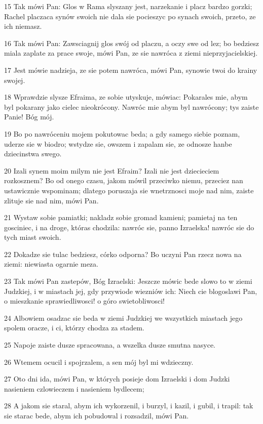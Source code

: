 \par 15 Tak mówi Pan: Glos w Rama slyszany jest, narzekanie i placz bardzo gorzki; Rachel placzaca synów swoich nie dala sie pocieszyc po synach swoich, przeto, ze ich niemasz.
\par 16 Tak mówi Pan: Zawsciagnij glos swój od placzu, a oczy swe od lez; bo bedziesz miala zaplate za prace swoje, mówi Pan, ze sie nawróca z ziemi nieprzyjacielskiej.
\par 17 Jest mówie nadzieja, ze sie potem nawróca, mówi Pan, synowie twoi do krainy swojej.
\par 18 Wprawdzie slysze Efraima, ze sobie utyskuje, mówiac: Pokarales mie, abym byl pokarany jako cielec nieokrócony. Nawróc mie abym byl nawrócony; tys zaiste Panie! Bóg mój.
\par 19 Bo po nawróceniu mojem pokutowac beda; a gdy samego siebie poznam, uderze sie w biodro; wstydze sie, owszem i zapalam sie, ze odnosze hanbe dziecinstwa swego.
\par 20 Izali synem moim milym nie jest Efraim? Izali nie jest dziecieciem rozkosznem? Bo od onego czasu, jakom mówil przeciwko niemu, przeciez nan ustawicznie wspominam; dlatego poruszaja sie wnetrznosci moje nad nim, zaiste zlituje sie nad nim, mówi Pan.
\par 21 Wystaw sobie pamiatki; nakladz sobie gromad kamieni; pamietaj na ten gosciniec, i na droge, któras chodzila: nawróc sie, panno Izraelska! nawróc sie do tych miast swoich.
\par 22 Dokadze sie tulac bedziesz, córko odporna? Bo uczyni Pan rzecz nowa na ziemi: niewiasta ogarnie meza.
\par 23 Tak mówi Pan zastepów, Bóg Izraelski: Jeszcze mówic bede slowo to w ziemi Judzkiej, i w miastach jej, gdy przywiode wiezniów ich: Niech cie blogoslawi Pan, o mieszkanie sprawiedliwosci! o góro swietobliwosci!
\par 24 Albowiem osadzac sie beda w ziemi Judzkiej we wszystkich miastach jego spolem oracze, i ci, którzy chodza za stadem.
\par 25 Napoje zaiste dusze spracowana, a wszelka dusze smutna nasyce.
\par 26 Wtemem ocucil i spojrzalem, a sen mój byl mi wdzieczny.
\par 27 Oto dni ida, mówi Pan, w których posieje dom Izraelski i dom Judzki nasieniem czlowieczem i nasieniem bydlecem;
\par 28 A jakom sie staral, abym ich wykorzenil, i burzyl, i kazil, i gubil, i trapil: tak sie starac bede, abym ich pobudowal i rozsadzil, mówi Pan.
